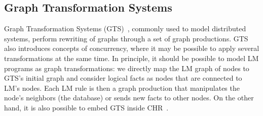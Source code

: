 \subsection{Graph Transformation Systems}

Graph Transformation Systems (GTS)~\cite{Ehrig:2004vn}, commonly used to model
distributed systems, perform rewriting of graphs through a set of graph
productions. GTS also introduces concepts of concurrency, where it may be
possible to apply several transformations at the same time. In principle, it
should be possible to model LM programs as graph transformations: we directly
map the LM graph of nodes to GTS's initial graph and consider logical facts as
nodes that are connected to LM's nodes. Each LM rule is then a graph production
that manipulates the node's neighbors (the database) or sends new facts to other
nodes. On the other hand, it is also possible to embed GTS inside
CHR~\cite{Raiser:2011:AGT:1972935.1972938}.
